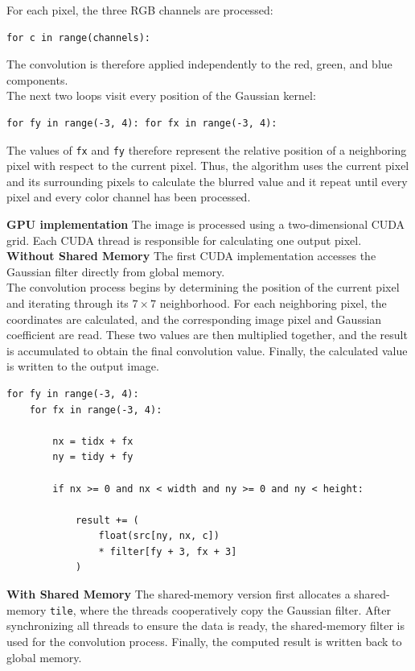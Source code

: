 \documentclass{article}
\begin{document}
For each pixel, the three RGB channels are processed: 
\begin{verbatim} 
for c in range(channels):
\end{verbatim} 
The convolution is therefore applied independently to the red, green, and blue components.\\

The next two loops visit every position of the Gaussian kernel: \begin{verbatim} 
for fy in range(-3, 4): for fx in range(-3, 4): 
\end{verbatim}
The values of \texttt{fx} and \texttt{fy} therefore represent the relative position of a neighboring pixel with respect to the current pixel. Thus, the algorithm uses the current pixel and its surrounding pixels to calculate the blurred value and it repeat until every pixel and every color channel has been processed.

\textbf{GPU implementation} The image is processed using a two-dimensional CUDA grid. Each CUDA thread is responsible for calculating one output pixel.\\

\textbf{Without Shared Memory} The first CUDA implementation accesses the Gaussian filter directly from global memory.\\

The convolution process begins by determining the position of the current pixel and iterating through its $7\times7$ neighborhood. For each neighboring pixel, the coordinates are calculated, and the corresponding image pixel and Gaussian coefficient are read. These two values are then multiplied together, and the result is accumulated to obtain the final convolution value. Finally, the calculated value is written to the output image.

\begin{verbatim}
for fy in range(-3, 4):
    for fx in range(-3, 4):

        nx = tidx + fx
        ny = tidy + fy

        if nx >= 0 and nx < width and ny >= 0 and ny < height:

            result += (
                float(src[ny, nx, c])
                * filter[fy + 3, fx + 3]
            )
\end{verbatim}

\textbf{With Shared Memory}
The shared-memory version first allocates a shared-memory \texttt{tile}, where the threads cooperatively copy the Gaussian filter. After synchronizing all threads to ensure the data is ready, the shared-memory filter is used for the convolution process. Finally, the computed result is written back to global memory.
\end{document}
